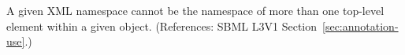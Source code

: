 A given XML namespace cannot be the namespace of more than one top-level
element within a given \Annotation object.  (References: SBML L3V1
Section~\ref{sec:annotation-use}.)

